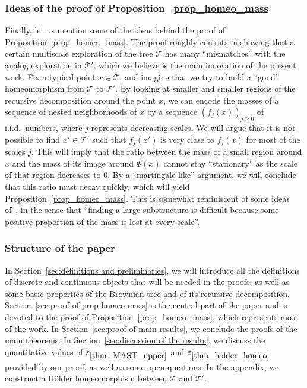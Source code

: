 \documentclass[JEP,XML,SOM,Unicode,NoFloatCountersInSection,published]{cedram}
\newcommand{\Tt}{\mathcal{T}}
\let\eps\varepsilon
\theoremstyle{plain}
\theoremstyle{definition}
\begin{document}
\subsubsection*{Ideas of the proof of Proposition~\ref{prop_homeo_mass}}
Finally, let us mention some of the ideas behind the proof of Proposition~\ref{prop_homeo_mass}. The proof roughly consists in showing that a certain multiscale exploration of the tree $\Tt$ has many ``mismatches'' with the analog exploration in $\Tt'$, which we believe is the main innovation of the present work.
Fix a typical point $x \in \Tt$, and imagine that we try to build a ``good'' homeomorphism from $\Tt$ to $\Tt'$. By looking at smaller and smaller regions of the recursive decomposition around the point $x$, we can encode the masses of a sequence of nested neighborhoods of $x$ by a sequence $\left(f_j(x) \right)_{j \geq 0}$ of
i.i.d.\ numbers, where $j$ represents decreasing scales.
We will argue that it is not possible to find $x' \in \Tt'$ such that $f_j(x')$ is very close to $f_j(x)$ for most of the scales $j$.
This will imply that the ratio between the mass of a small region around $x$ and the mass of its image around $\Psi(x)$ cannot stay ``stationary'' as the scale of that region decreases to $0$.
By a ``martingale-like'' argument, we will conclude that this ratio must decay quickly, which will yield Proposition~\ref{prop_homeo_mass}. This is somewhat reminiscent of some ideas of~\cite{BBDFGMP22}, in the sense that ``finding a large substructure is difficult because some positive proportion of the mass is lost at every scale''.

\subsubsection*{Structure of the paper}
In Section~\ref{sec:definitions and preliminaries}, we will introduce all the definitions of discrete and continuous objects that will be needed in the proofs, as well as some basic properties of the Brownian tree and of its recursive decomposition.
Section~\ref{sec:proof of prop homeo mass} is the central part of the paper and is devoted to the proof of Proposition~\ref{prop_homeo_mass}, which represents most of the work.
In Section~\ref{sec:proof of main results}, we conclude the proofs of the main theorems.
In Section~\ref{sec:discussion of the results}, we discuss the quantitative values of $\eps_{\ref{thm_MAST_upper}}$ and $\eps_{\ref{thm_holder_homeo}}$ provided by our proof, as well as some open questions.
In the appendix, we construct a Hölder homeomorphism between $\Tt$ and $\Tt'$.
\end{document}
